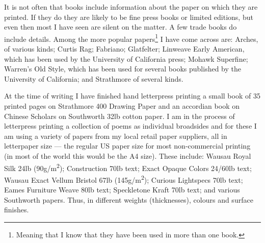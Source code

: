 \documentclass[10pt,letterpaper,extrafontsizes]{memoir}
\newcommand*{\sqrd}[1]{#1\textsuperscript{2}}
\newcommand*{\gsm}{g/\sqrd{m}}
\begin{document}


    It is not often that books include information about the paper on which
they are printed. If they do they are likely to be fine press books or 
limited editions, but even then most I have seen are silent on the matter. 
A few trade books do include details. Among the more popular 
papers\footnote{Meaning that I know that they have been used in more than
one book.} I have
come across are: 
Arches, of various kinds; 
Curtis Rag;
Fabriano;
Glatfelter;
Linweave Early American, which
has been used by the University of California press;
Mohawk Superfine;
Warren's Old Style, which has been used for 
several books published by the University of California; and 
Strathmore of several kinds.

   At the time of writing I have finished hand letterpress printing a 
small book of 35 printed pages on Strathmore 400 Drawing Paper and an 
accordian book on Chinese Scholars on Southworth 
32lb cotton paper. I am in the process of letterpress printing a collection
of poems as individual broadsides and for these I am using a variety of
papers from my local retail paper suppliers, all in letterpaper size ---
the regular US paper size for most non-commercial printing (in most of the 
world this would be the A4 size). These include: Wausau Royal Silk 24lb
(90\gsm);
Construction 70lb text; Exact Opaque Colors 24/60lb text; Wausau Exact 
Vellum Bristol 67lb (145\gsm); Curious Lightspecs 70lb text; Eames Furniture
Weave 80lb text; Speckletone Kraft 70lb text; and various Southworth papers. 
Thus, in different weights (thicknesses), colours and surface finishes.
\end{document}
